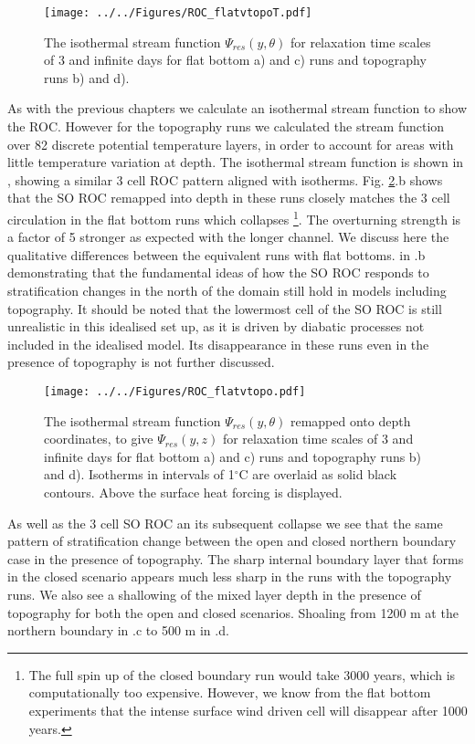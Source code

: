 \begin{figure}[H]
\noindent \texttt{[image: ../../Figures/ROC\_flatvtopoT.pdf]} 
\caption{The isothermal stream function $\Psi_{res}(y,\theta)$ for relaxation time scales of 3 and infinite days for flat bottom a) and c) runs and topography runs b) and d).}
\label{fig:RemapT_full}
\end{figure}


As with the previous chapters we calculate an isothermal stream function to show the ROC. However for the topography runs we calculated the stream function over 82 discrete potential temperature layers, in order to account for areas with little temperature variation at depth. The isothermal stream function is shown in , showing a similar 3 cell ROC pattern aligned with isotherms.
Fig. \ref{fig:Remap_full}.b shows that the SO ROC remapped into depth in these runs closely matches the 3 cell circulation in the flat bottom runs which collapses \footnote{The full spin up of the closed boundary run would take 3000 years, which is computationally too expensive. However, we know from the flat bottom experiments that the intense surface wind driven cell will disappear after 1000 years.}. The overturning strength is a factor of 5 stronger as expected with the longer channel. We discuss here the qualitative differences between the equivalent runs with flat bottoms. in .b demonstrating that the fundamental ideas of how the SO ROC responds to stratification changes in the north of the domain still hold in models including topography. It should be noted that the lowermost cell of the SO ROC is still unrealistic in this idealised set up, as it is driven by diabatic processes not included in the idealised model. Its disappearance in these runs even in the presence of topography is not further discussed.

\begin{figure}[H]
\noindent \texttt{[image: ../../Figures/ROC\_flatvtopo.pdf]} 
\caption{The isothermal stream function $\Psi_{res}(y,\theta)$ remapped onto depth coordinates, to give $\Psi_{res}(y,z)$ for relaxation time scales of 3 and infinite days for flat bottom a) and c) runs and topography runs b) and d). Isotherms in intervals of 1$^{\circ}$C are overlaid as solid black contours. Above the surface heat forcing is displayed.}
\label{fig:Remap_full}
\end{figure}

As well as the 3 cell SO ROC an its subsequent collapse we see that the same pattern of stratification change between the open and closed northern boundary case in the presence of topography. The sharp internal boundary layer that forms in the closed scenario appears much less sharp in the runs with the topography runs. We also see a shallowing of the mixed layer depth in the presence of topography for both the open and closed scenarios. Shoaling from 1200 m at the northern boundary in .c to 500 m in .d. 



